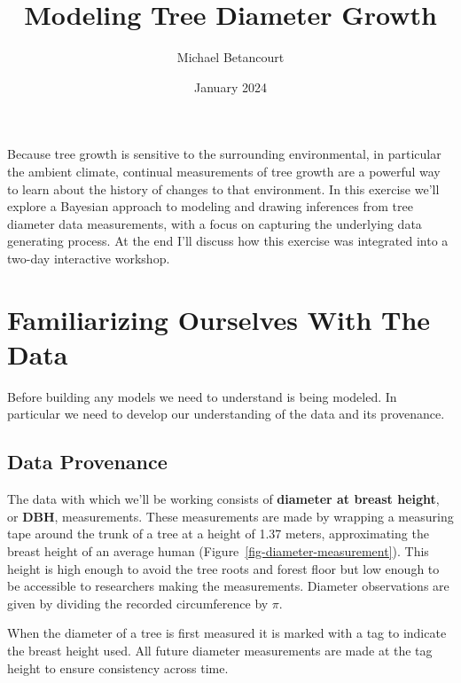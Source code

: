 \documentclass[
  letterpaper,
  DIV=11,
  numbers=noendperiod]{scrartcl}
\title{Modeling Tree Diameter Growth}
\author{Michael Betancourt}
\date{January 2024}
\renewcommand*\contentsname{Table of contents}
\newcommand\contentsname{Table of contents}
\begin{document}
\maketitle
\ifdefined\Shaded\renewenvironment{Shaded}{\begin{tcolorbox}[boxrule=0pt, sharp corners, interior hidden, breakable, borderline west={3pt}{0pt}{shadecolor}, enhanced, frame hidden]}{\end{tcolorbox}}\fi

\renewcommand*\contentsname{Table of contents}
{
\hypersetup{linkcolor=}
\setcounter{tocdepth}{3}
\tableofcontents
}
Because tree growth is sensitive to the surrounding environmental, in
particular the ambient climate, continual measurements of tree growth
are a powerful way to learn about the history of changes to that
environment. In this exercise we'll explore a Bayesian approach to
modeling and drawing inferences from tree diameter data measurements,
with a focus on capturing the underlying data generating process. At the
end I'll discuss how this exercise was integrated into a two-day
interactive workshop.

\hypertarget{familiarizing-ourselves-with-the-data}{%
\section{Familiarizing Ourselves With The
Data}\label{familiarizing-ourselves-with-the-data}}

Before building any models we need to understand is being modeled. In
particular we need to develop our understanding of the data and its
provenance.

\hypertarget{sec:provenance}{%
\subsection{Data Provenance}\label{sec:provenance}}

The data with which we'll be working consists of \textbf{diameter at
breast height}, or \textbf{DBH}, measurements. These measurements are
made by wrapping a measuring tape around the trunk of a tree at a height
of 1.37 meters, approximating the breast height of an average human
(Figure~\ref{fig-diameter-measurement}). This height is high enough to
avoid the tree roots and forest floor but low enough to be accessible to
researchers making the measurements. Diameter observations are given by
dividing the recorded circumference by \(\pi\).

When the diameter of a tree is first measured it is marked with a tag to
indicate the breast height used. All future diameter measurements are
made at the tag height to ensure consistency across time.
\end{document}
